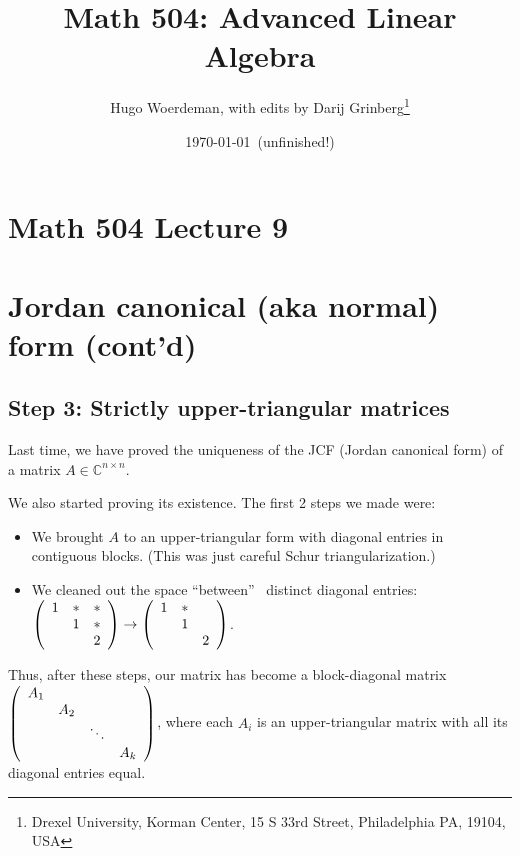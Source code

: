 \documentclass[numbers=enddot,12pt,final,onecolumn,notitlepage]{scrartcl}%
\numberwithin{exer}{subsection}
\theoremstyle{definition}
\begin{document}
\title{Math 504: Advanced Linear Algebra}
\author{Hugo Woerdeman, with edits by Darij Grinberg\thanks{Drexel University, Korman
Center, 15 S 33rd Street, Philadelphia PA, 19104, USA}}
\date{\today\ (unfinished!)}
\maketitle
\tableofcontents

\section*{Math 504 Lecture 9}

\section{Jordan canonical (aka normal) form (cont'd)}

\subsection{Step 3: Strictly upper-triangular matrices}

Last time, we have proved the uniqueness of the JCF (Jordan canonical form) of
a matrix $A\in\mathbb{C}^{n\times n}$.

We also started proving its existence. The first 2 steps we made were:

\begin{itemize}
\item We brought $A$ to an upper-triangular form with diagonal entries in
contiguous blocks. (This was just careful Schur triangularization.)

\item We cleaned out the space \textquotedblleft between\textquotedblright%
\ distinct diagonal entries: $\left(
\begin{array}
[c]{ccc}%
1 & \ast & \ast\\
& 1 & \ast\\
&  & 2
\end{array}
\right)  \rightarrow\left(
\begin{array}
[c]{ccc}%
1 & \ast & \\
& 1 & \\
&  & 2
\end{array}
\right)  $.
\end{itemize}

Thus, after these steps, our matrix has become a block-diagonal matrix
$\left(
\begin{array}
[c]{cccc}%
A_{1} &  &  & \\
& A_{2} &  & \\
&  & \ddots & \\
&  &  & A_{k}%
\end{array}
\right)  $, where each $A_{i}$ is an upper-triangular matrix with all its
diagonal entries equal.
\end{document}
